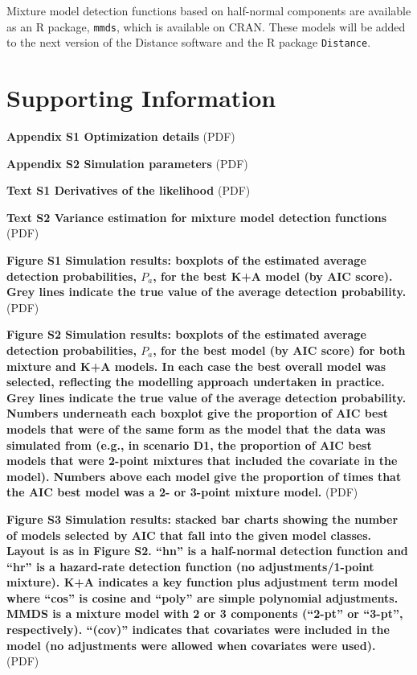 \documentclass[10pt]{article}
\begin{document}
Mixture model detection functions based on half-normal components are available as an \textsf{R} package, \texttt{mmds}, which is available on CRAN. These models will be added to the next version of the Distance software and the \textsf{R} package \texttt{Distance}.

\section*{Supporting Information}

\textbf{Appendix S1 Optimization details} (PDF)

\textbf{Appendix S2 Simulation parameters} (PDF)

\textbf{Text S1 Derivatives of the likelihood} (PDF)

\textbf{Text S2 Variance estimation for mixture model detection functions} (PDF)

\textbf{Figure S1 Simulation results: boxplots of the estimated average detection probabilities, $P_a$, for the best K+A model (by AIC score). Grey lines indicate the true value of the average detection probability.} (PDF)

\textbf{Figure S2 Simulation results: boxplots of the estimated average detection probabilities, $P_a$, for the best model (by AIC score) for both mixture and K+A models. In each case the best overall model was selected, reflecting the modelling approach undertaken in practice. Grey lines indicate the true value of the average detection probability. Numbers underneath each boxplot give the proportion of AIC best models that were of the same form as the model that the data was simulated from (e.g., in scenario D1, the proportion of AIC best models that were 2-point mixtures that included the covariate in the model). Numbers above each model give the proportion of times that the AIC best model was a 2- or 3-point mixture model.} (PDF)

\textbf{Figure S3 Simulation results: stacked bar charts showing the number of models selected by AIC that fall into the given model classes. Layout is as in Figure S2. ``hn'' is a half-normal detection function and ``hr'' is a hazard-rate detection function (no adjustments/1-point mixture). K+A indicates a key function plus adjustment term model where ``cos'' is cosine and ``poly'' are simple polynomial adjustments. MMDS is a mixture model with 2 or 3 components (``2-pt'' or ``3-pt'', respectively). ``(cov)'' indicates that covariates were included in the model (no adjustments were allowed when covariates were used).} (PDF)
\end{document}
